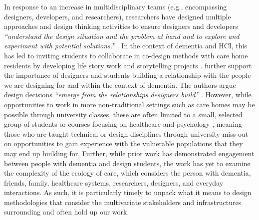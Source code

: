In response to an increase in multidisciplinary teams (e.g., encompassing designers, developers, and researchers), researchers have designed multiple approaches and design thinking activities to ensure designers and developers  \textit{``understand the design situation and the problem at hand and to explore and experiment with potential solutions.''} \citep[pg. 21]{dalsgaard2017instruments}. In the context of dementia and HCI, this has led to inviting students to collaborate in co-design methods with care home residents by developing life story work \citep{foley_student_2020} and storytelling projects \citep{hannan_zeitgeist_2019}. \cite{hendriks_valuing_2018} further support the importance of designers and students building a relationship with the people we are designing for and within the context of dementia. The authors argue design decisions \textit{``emerge from the relationships designers build''} \citep[pg. 3]{hendriks_valuing_2018}. However, while opportunities to work in more non-traditional settings such as care homes may be possible through university classes, these are often limited to a small, selected group of students or courses focusing on healthcare and psychology \citep{kinnunen_understanding_2018}, meaning those who are taught technical or design disciplines through university miss out on opportunities to gain experience with the vulnerable populations that they may end up building for. Further, while prior work has demonstrated engagement between people with dementia and design students, the work has yet to examine the complexity of the ecology of care, which considers the person with dementia, friends, family, healthcare systems, researchers, designers, and everyday interactions. As such, it is particularly timely to unpack what it means to design methodologies that consider the multivariate stakeholders and infrastructures surrounding and often hold up our work. 


